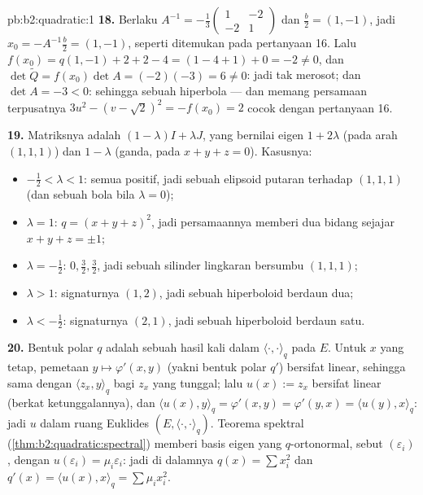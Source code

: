 \begin{solution}{pb:b2:quadratic:1}
\textbf{18.} Berlaku $A^{-1} = -\frac13\begin{pmatrix} 1 & -2\\ -2 &
1\end{pmatrix}$ dan $\frac b2 = (1, -1)$, jadi $x_0 =
-A^{-1}\frac b2 = (1, -1)$, seperti ditemukan pada pertanyaan 16. Lalu $f(x_0) =
q(1,-1) + 2 + 2 - 4 = (1 - 4 + 1) + 0 = -2 \neq 0$, dan
$\det\widetilde Q = f(x_0)\det A = (-2)(-3) = 6 \neq 0$: jadi
tak merosot; dan $\det A = -3 < 0$: sehingga sebuah hiperbola --- dan memang
persamaan terpusatnya $3u^2 - (v - \sqrt2)^2 = -f(x_0) = 2$
cocok dengan pertanyaan 16.

\textbf{19.} Matriksnya adalah $(1-\lambda)I + \lambda J$, yang
bernilai eigen $1 + 2\lambda$ (pada arah $(1,1,1)$) dan $1 -
\lambda$ (ganda, pada $x + y + z = 0$). Kasusnya:
\begin{itemize}
  \item $-\frac12 < \lambda < 1$: semua  positif, jadi
        sebuah elipsoid putaran terhadap $(1,1,1)$ (dan sebuah bola
        bila $\lambda = 0$);
  \item $\lambda = 1$: $q = (x+y+z)^2$, jadi persamaannya memberi
        dua bidang sejajar $x + y + z = \pm1$;
  \item $\lambda = -\frac12$:  $0, \frac32,
        \frac32$, jadi sebuah silinder lingkaran bersumbu $(1,1,1)$;
  \item $\lambda > 1$: signaturnya $(1, 2)$, jadi sebuah hiperboloid
        berdaun dua;
  \item $\lambda < -\frac12$: signaturnya $(2, 1)$, jadi sebuah
        hiperboloid berdaun satu.
\end{itemize}

\textbf{20.} Bentuk polar $q$ adalah sebuah hasil kali dalam
$\langle\cdot,\cdot\rangle_q$ pada $E$. Untuk $x$ yang tetap, pemetaan $y \mapsto
\varphi'(x, y)$ (yakni bentuk polar $q'$) bersifat linear, sehingga sama dengan
$\langle z_x, y\rangle_q$ bagi $z_x$ yang tunggal; lalu $u(x) := z_x$ bersifat
linear (berkat ketunggalannya), dan $\langle u(x), y\rangle_q =
\varphi'(x,y) = \varphi'(y,x) = \langle u(y), x\rangle_q$: jadi $u$
 dalam ruang Euklides $(E,
\langle\cdot,\cdot\rangle_q)$. Teorema spektral
(\cref{thm:b2:quadratic:spectral}) memberi basis eigen yang
$q$-ortonormal, sebut $(\varepsilon_i)$, dengan $u(\varepsilon_i) =
\mu_i\varepsilon_i$: jadi di dalamnya $q(x) = \sum x_i^2$ dan $q'(x) =
\langle u(x), x\rangle_q = \sum\mu_ix_i^2$.


\end{solution}
